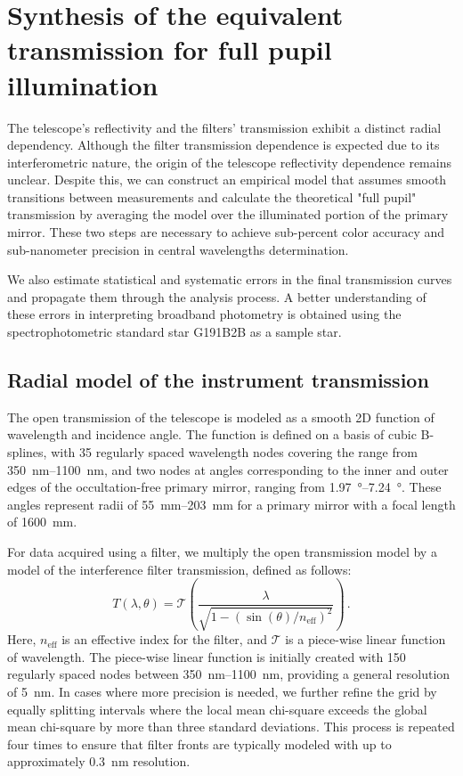 \section{Synthesis of the equivalent transmission for full pupil illumination}
\label{sec:pupil_stitching}

The telescope's reflectivity and the filters' transmission exhibit a distinct radial dependency. Although the filter
transmission dependence is expected due to its interferometric nature,
the origin of the telescope reflectivity dependence remains
unclear. Despite this, we can construct an empirical model that
assumes smooth transitions between measurements and calculate the
theoretical "full pupil" transmission by averaging the model over the
illuminated portion of the primary mirror. These two steps are
necessary to achieve sub-percent color accuracy and sub-nanometer
precision in central wavelengths determination.

We also estimate statistical and systematic errors in the final
transmission curves and propagate them through the analysis process. A
better understanding of these errors in interpreting broadband
photometry is obtained using the spectrophotometric standard star
G191B2B as a sample star.


\subsection{Radial model of the instrument transmission}
\label{sec:model}

The open transmission of the telescope is modeled as a smooth 2D
function of wavelength and incidence angle. The function is defined on
a basis of cubic B-splines, with \num{35} regularly spaced wavelength
nodes covering the range from \SIrange{350}{1100}{nm}, and two nodes
at angles corresponding to the inner and outer edges of the
occultation-free primary mirror, ranging from \SIrange{1.97}{7.24}
{\degree}. These angles represent radii of \SIrange{55}{203}{mm} for a
primary mirror with a focal length of \SI{1600}{mm}.

For data acquired using a filter, we multiply the open transmission
model by a model of the interference filter transmission, defined as
follows:
\begin{equation}
  \label{eq:filtertransmission}
T(\lambda, \theta) = \mathcal T\left(\frac{\lambda}{\sqrt{1 -
    (\sin(\theta) / n_\text{eff})^2}}\right)\,.
\end{equation}
Here, $n_\text{eff}$ is an effective index for the filter,
and $\mathcal{T}$ is a piece-wise linear function of wavelength. The piece-wise
linear function is initially created with \num{150} regularly spaced
nodes between \SIrange{350}{1100}{nm}, providing a general resolution
of \SI{5}{nm}. In cases where more precision is needed, we further
refine the grid by equally splitting intervals where the local mean
chi-square exceeds the global mean chi-square by more than three
standard deviations. This process is repeated four times to ensure
that filter fronts are typically modeled with up to approximately
\SI{0.3}{nm} resolution.


